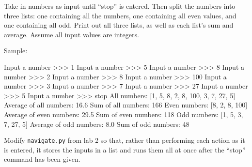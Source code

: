 \documentclass[11pt]{cselabheader}
\begin{document}
\begin{ex}[parity.py] Take in numbers as input until ``stop'' is entered. Then
  split the numbers into three lists: one containing all the numbers, one
  containing all even values, and one containing all odd. Print out all three
  lists, as well as each list's sum and average. Assume all input values are
  integers.

  Sample:

\begin{verbatimcode}
Input a number >>> 1
Input a number >>> 5
Input a number >>> 8
Input a number >>> 2
Input a number >>> 8
Input a number >>> 100
Input a number >>> 3
Input a number >>> 7
Input a number >>> 27
Input a number >>> 5
Input a number >>> stop
All numbers: [1, 5, 8, 2, 8, 100, 3, 7, 27, 5]
Average of all numbers: 16.6
Sum of all numbers: 166
Even numbers: [8, 2, 8, 100]
Average of even numbers: 29.5
Sum of even numbers: 118
Odd numbers: [1, 5, 3, 7, 27, 5]
Average of odd numbers: 8.0
Sum of odd numbers: 48
\end{verbatimcode}
\end{ex}


\begin{ex}[navigate2.py] Modify \texttt{navigate.py} from lab 2 so that,
  rather than performing each action as it is entered, it stores the inputs in a
  list and runs them all at once after the ``stop'' command has been given.
\end{ex}
\end{document}
